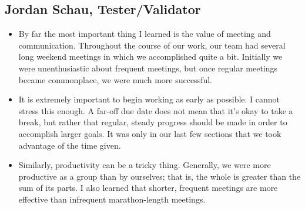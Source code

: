\subsection{Jordan Schau, Tester/Validator}
\begin{itemize}
\item By far the most important thing I learned is the value of meeting and communication. Throughout the course of our work, our team had several long weekend meetings in which we accomplished quite a bit. Initially we were unenthusiastic about frequent meetings, but once regular meetings became commonplace, we were much more successful.
\item It is extremely important to begin working as early as possible. I cannot stress this enough. A far-off due date does not mean that it's okay to take a break, but rather that regular, steady progress should be made in order to accomplish larger goals. It was only in our last few sections that we took advantage of the time given.
\item Similarly, productivity can be a tricky thing. Generally, we were more productive as a group than by ourselves; that is, the whole is greater than the sum of its parts. I also learned that shorter, frequent meetings are more effective than infrequent marathon-length meetings.
\end{itemize}
